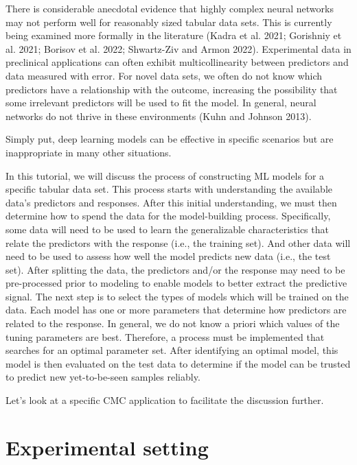 \documentclass[
  letterpaper,
  DIV=11,
  numbers=noendperiod]{scrartcl}
\begin{document}
There is considerable anecdotal evidence that highly complex neural
networks may not perform well for reasonably sized tabular data sets.
This is currently being examined more formally in the literature (Kadra
et al. 2021; Gorishniy et al. 2021; Borisov et al. 2022; Shwartz-Ziv and
Armon 2022). Experimental data in preclinical applications can often
exhibit multicollinearity between predictors and data measured with
error. For novel data sets, we often do not know which predictors have a
relationship with the outcome, increasing the possibility that some
irrelevant predictors will be used to fit the model. In general, neural
networks do not thrive in these environments (Kuhn and Johnson 2013).

Simply put, deep learning models can be effective in specific scenarios
but are inappropriate in many other situations.

In this tutorial, we will discuss the process of constructing ML models
for a specific tabular data set. This process starts with understanding
the available data's predictors and responses. After this initial
understanding, we must then determine how to spend the data for the
model-building process. Specifically, some data will need to be used to
learn the generalizable characteristics that relate the predictors with
the response (i.e., the training set). And other data will need to be
used to assess how well the model predicts new data (i.e., the test
set). After splitting the data, the predictors and/or the response may
need to be pre-processed prior to modeling to enable models to better
extract the predictive signal. The next step is to select the types of
models which will be trained on the data. Each model has one or more
parameters that determine how predictors are related to the response. In
general, we do not know a priori which values of the tuning parameters
are best. Therefore, a process must be implemented that searches for an
optimal parameter set. After identifying an optimal model, this model is
then evaluated on the test data to determine if the model can be trusted
to predict new yet-to-be-seen samples reliably.

Let's look at a specific CMC application to facilitate the discussion
further.

\hypertarget{experimental-setting}{%
\section{Experimental setting}\label{experimental-setting}}
\end{document}

